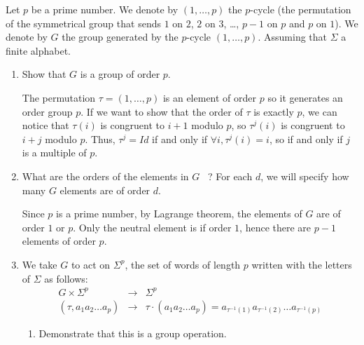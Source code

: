 \documentclass[a4paper,11pt]{exam}
\newcommand{\Z}{\mathbb{Z}}
\newcommand{\N}{\mathbb{N}}
\begin{document}
\begin{questions}




\question
Let $p$ be a prime number.
We denote by $(1,\dots,p)$ the $p$-cycle (the permutation of the symmetrical group that sends $1$ on $2$, $2$ on $3$, \dots, $p-1$ on $p$ and $p$ on $1$).
We denote by $G$ the group generated by the $p$-cycle $(1,\dots,p)$. Assuming that $\Sigma$ a finite alphabet. 
\begin{enumerate}
	\item Show that $G$ is a group of order $p$.
	
	\begin{solution}
		The permutation $\tau=(1,\dots,p)$ is an element of order $p$ so it generates an order group $p$.
		If we want to show that the order of $\tau$ is exactly $p$, we can notice that $\tau(i)$ is congruent to $i+1$ modulo $p$, so $\tau^j(i)$ is congruent to $i+j$ modulo $p$. Thus, $\tau^j=Id$ if and only if $\forall i, \tau^j(i)=i$, so if and only if $j$ is a multiple of $p$.
	\end{solution}
	
	\item What are the orders of the elements in $G$~ ? 
	For each $d$, we will specify how many $G$ elements are of order $d$.
	
	\begin{solution}
		Since $p$ is a prime number, by Lagrange theorem, the elements of $G$ are of order $1$ or $p$.
		Only the neutral element is if order $1$, hence there are $p-1$ elements of order $p$.
	\end{solution}
	
	\item We take $ G $ to act on $ \Sigma^p $, the set of words of length $p $ written with the letters of $ \Sigma $ as follows:
	\[
	\begin{array}{lll}
	G \times \Sigma^p & \rightarrow & \Sigma^p \\
	(\tau, a_1a_2\dots a_p)& \to & \tau \cdot (a_1a_2\dots a_p) =
	a_{\tau^{-1}(1)} a_{\tau^{-1}(2)}\dots a_{\tau^{-1}(p)}
	\end{array}
	\]
	\begin{enumerate}
		\item Demonstrate that this is a group operation.
		

\end{enumerate}
\end{enumerate}
\end{questions}
\end{document}
